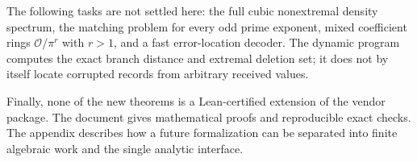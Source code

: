 The following tasks are not settled here: the full cubic nonextremal
density spectrum, the matching problem for every odd prime exponent,
mixed coefficient rings $\mathcal O/\pi^r$ with $r>1$, and a fast
error-location decoder. The dynamic program computes the exact
branch distance and extremal deletion set; it does not by itself locate
corrupted records from arbitrary received values.

Finally, none of the new theorems is a Lean-certified extension of the
vendor package. The document gives mathematical proofs and reproducible
exact checks. The appendix describes how a future formalization can be
separated into finite algebraic work and the single analytic interface.
